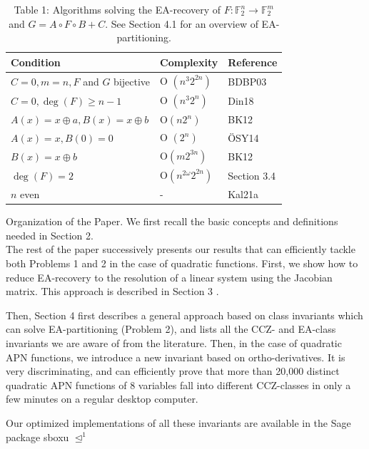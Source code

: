 \documentclass[10pt]{article}
\begin{document}
\begin{table}[h]
\begin{center}
\begin{tabular}{|l|l|l|}
\hline
Condition & Complexity & Reference \\
\hline
$C=0, m=n, F$ and $G$ bijective & O $\left(n^{3} 2^{2 n}\right)$ & BDBP03 \\
\hline
$C=0, \operatorname{deg}(F) \geqslant n-1$ & O $\left(n^{3} 2^{n}\right)$ & Din18 \\
\hline
$A(x)=x \oplus a, B(x)=x \oplus b$ & $\mathrm{O}\left(n 2^{n}\right)$ & BK12 \\
\hline
$A(x)=x, B(0)=0$ & O $\left(2^{n}\right)$ & ÖSY14 \\
\hline
$B(x)=x \oplus b$ & $\mathrm{O}\left(m 2^{3 n}\right)$ & BK12 \\
\hline
$\operatorname{deg}(F)=2$ & $\mathrm{O}\left(n^{2 \omega} 2^{2 n}\right)$ & Section 3.4 \\
\hline
$n$ even & - & Kal21a \\
\hline
\end{tabular}
\captionsetup{labelformat=empty}
\caption{Table 1: Algorithms solving the EA-recovery of $F: \mathbb{F}_{2}^{n} \rightarrow \mathbb{F}_{2}^{m}$ and $G=A \circ F \circ B+C$. See Section 4.1 for an overview of EA-partitioning.}
\end{center}
\end{table}

Organization of the Paper. We first recall the basic concepts and definitions needed in Section 2.\\
The rest of the paper successively presents our results that can efficiently tackle both Problems 1 and 2 in the case of quadratic functions. First, we show how to reduce EA-recovery to the resolution of a linear system using the Jacobian matrix. This approach is described in Section 3 .

Then, Section 4 first describes a general approach based on class invariants which can solve EA-partitioning (Problem 2), and lists all the CCZ- and EA-class invariants we are aware of from the literature. Then, in the case of quadratic APN functions, we introduce a new invariant based on ortho-derivatives. It is very discriminating, and can efficiently prove that more than 20,000 distinct quadratic APN functions of 8 variables fall into different CCZ-classes in only a few minutes on a regular desktop computer.

Our optimized implementations of all these invariants are available in the Sage package sboxu $\unlhd^{1}$
\end{document}
